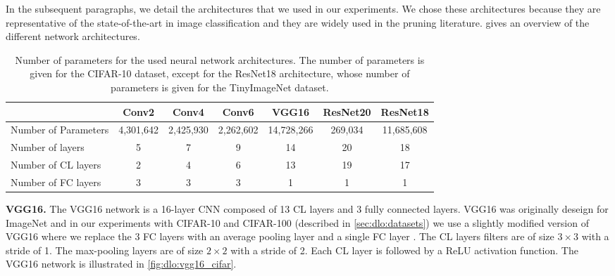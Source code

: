 In the subsequent paragraphs, we detail the architectures that we used in our
experiments. We chose these architectures because they are representative of the
state-of-the-art in image classification and they are widely used in the pruning
literature.  gives an overview of the different
network architectures.\\

\begin{table}[ht!]
  \centering
  \begin{tabular}{lcccccc}
    \cline{2-7}
    & \textbf{Conv2} & \textbf{Conv4} & \textbf{Conv6} & \textbf{VGG16} & \textbf{ResNet20} & \textbf{ResNet18} \\ \hline
    Number of Parameters & 4,301,642 & 2,425,930  & 2,262,602      & 14,728,266
    & 269,034           & 11,685,608 \\
    Number of layers & 5 & 7 & 9 & 14 & 20 & 18 \\
    Number of \ac{CL} layers & 2 & 4 & 6 & 13 & 19 & 17 \\
    Number of \ac{FC} layers & 3 & 3 & 3 & 1 & 1 & 1 \\ \hline
  \end{tabular}
  \caption{Number of parameters for the used neural network architectures. The
  number of parameters is given for the CIFAR-10 dataset, except for the
  ResNet18 architecture, whose number of parameters is given for the
  TinyImageNet dataset.}
  \label{tab:dlo:networks_size}
\end{table}

\noindent \textbf{VGG16.} The VGG16 network
\cite{DBLP:journals/corr/SimonyanZ14a} is a 16-layer \ac{CNN} composed of 13
\ac{CL} layers and 3 fully connected layers. VGG16 was originally deseign
for ImageNet \cite{deng2009imagenet} and in our experiments with CIFAR-10 and
CIFAR-100 (described in \cref{sec:dlo:datasets}) we use a slightly modified
version of VGG16 where we replace the 3 \ac{FC} layers with an average pooling
layer and a single \ac{FC} layer \cite{vggcifar}. The \ac{CL} layers
filters are of size $3\times 3$ with a stride of 1. The max-pooling layers are
of size $2\times 2$ with a stride of 2. Each \ac{CL} layer is followed by
a \ac{ReLU} activation function. The VGG16 network is illustrated in
\cref{fig:dlo:vgg16_cifar}.\\

